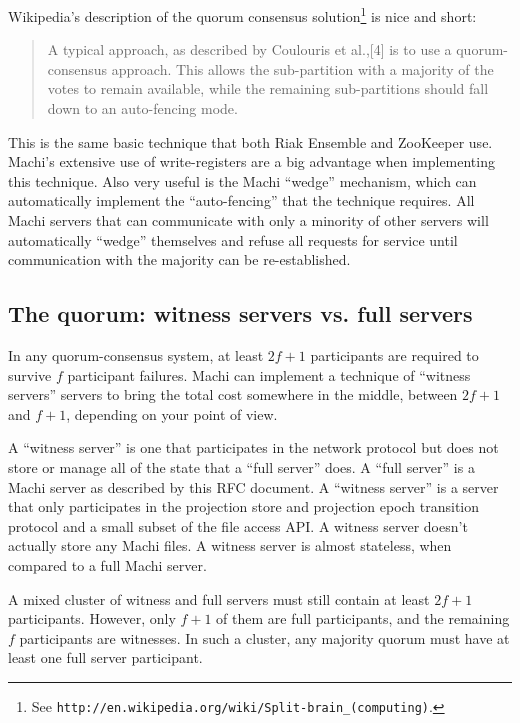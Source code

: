\documentclass[preprint,10pt]{sigplanconf}
\begin{document}
Wikipedia's description of the quorum consensus solution\footnote{See
  {\tt http://en.wikipedia.org/wiki/Split-brain\_(computing)}.} is nice
and short:

\begin{quotation}
A typical approach, as described by Coulouris et al.,[4] is to use a
quorum-consensus approach. This allows the sub-partition with a
majority of the votes to remain available, while the remaining
sub-partitions should fall down to an auto-fencing mode.
\end{quotation}

This is the same basic technique that
both Riak Ensemble and ZooKeeper use.  Machi's
extensive use of write-registers are a big advantage when implementing
this technique.  Also very useful is the Machi ``wedge'' mechanism,
which can automatically implement the ``auto-fencing'' that the
technique requires.  All Machi servers that can communicate with only
a minority of other servers will automatically ``wedge'' themselves
and refuse all requests for service until communication with the
majority can be re-established.

\subsection{The quorum: witness servers vs. full servers}

In any quorum-consensus system, at least $2f+1$ participants are
required to survive $f$ participant failures.  Machi can implement a
technique of ``witness servers'' servers to bring the total cost
somewhere in the middle, between $2f+1$ and $f+1$, depending on your
point of view.

A ``witness server'' is one that participates in the network protocol
but does not store or manage all of the state that a ``full server''
does.  A ``full server'' is a Machi server as
described by this RFC document.  A ``witness server'' is a server that
only participates in the projection store and projection epoch
transition protocol and a small subset of the file access API.
A witness server doesn't actually store any
Machi files.  A witness server is almost stateless, when compared to a
full Machi server.

A mixed cluster of witness and full servers must still contain at
least $2f+1$ participants.  However, only $f+1$ of them are full
participants, and the remaining $f$ participants are witnesses.  In
such a cluster, any majority quorum must have at least one full server
participant.
\end{document}
